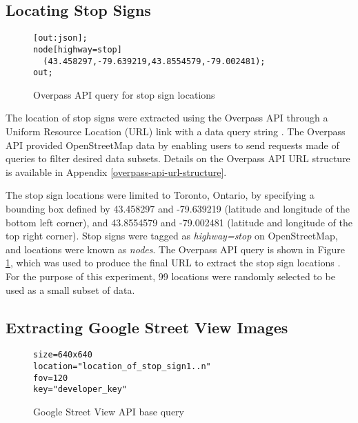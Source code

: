 \subsection{Locating Stop Signs} \label{locating-stop-signs}

\begin{figure}[H]
\begin{framed}
\begin{verbatim}
[out:json];
node[highway=stop]
  (43.458297,-79.639219,43.8554579,-79.002481);
out;
\end{verbatim}
\end{framed}
\caption{Overpass API query for stop sign locations}
\label{fig:query}
\end{figure}

The location of stop signs were extracted using the Overpass API through a Uniform Resource Location (URL) link with a data query string \cite{OpenStreetMap:2017, Lee:1994}. The Overpass API provided OpenStreetMap data by enabling users to send requests made of queries to filter desired data subsets. Details on the Overpass API URL structure is available in Appendix \ref{overpass-api-url-structure}. 

The stop sign locations were limited to Toronto, Ontario, by specifying a bounding box defined by 43.458297 and -79.639219 (latitude and longitude of the bottom left corner), and 43.8554579 and -79.002481 (latitude and longitude of the top right corner). Stop signs were tagged as \textit{highway=stop} on OpenStreetMap, and locations were known as \textit{nodes}. The Overpass API query is shown in Figure \ref{fig:query}, which was used to produce the final URL to extract the stop sign locations \cite{OpenStreetMap:2017}. For the purpose of this experiment, 99 locations were randomly selected to be used as a small subset of data.

\subsection{Extracting Google Street View Images} \label{extracting-google-street-view-images}

\begin{figure}[H]
\begin{framed}
\begin{verbatim}
size=640x640
location="location_of_stop_sign1..n"
fov=120
key="developer_key"
\end{verbatim}
\end{framed}
\caption{Google Street View API base query}
\label{fig:gsvquery}
\end{figure}


